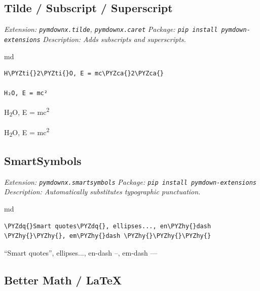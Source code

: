 \documentclass[a4paper,twoside]{article}
\begin{document}
\subsection{Tilde / Subscript / Superscript}\label{tilde-subscript-superscript}

\emph{Extension: \texttt{pymdownx.tilde}, \texttt{pymdownx.caret}}
\emph{Package: \texttt{pip install pymdown-\allowbreak{}extensions}}
\emph{Description: Adds subscripts and superscripts.}

\begin{code}{md}{}{}
\begin{Verbatim}[commandchars=\\\{\},breaklines, breakanywhere, commandchars=\\\{\}]
H\PYZti{}2\PYZti{}O, E = mc\PYZca{}2\PYZca{}

H₂O, E = mc²
\end{Verbatim}
\end{code}
\begin{displayquote}

H\textsubscript{2}O, E = mc\textsuperscript{2}

H\textsubscript{2}O, E = mc\textsuperscript{2}

\end{displayquote}
\subsection{SmartSymbols}\label{smartsymbols}

\emph{Extension: \texttt{pymdownx.smartsymbols}}
\emph{Package: \texttt{pip install pymdown-\allowbreak{}extensions}}
\emph{Description: Automatically substitutes typographic punctuation.}

\begin{code}{md}{}{}
\begin{Verbatim}[commandchars=\\\{\},breaklines, breakanywhere, commandchars=\\\{\}]
\PYZdq{}Smart quotes\PYZdq{}, ellipses..., en\PYZhy{}dash \PYZhy{}\PYZhy{}, em\PYZhy{}dash \PYZhy{}\PYZhy{}\PYZhy{}
\end{Verbatim}
\end{code}
\begin{displayquote}

\enquote{Smart quotes}, ellipses..., en-dash --, em-dash ---

\end{displayquote}
\subsection{Better Math / LaTeX}\label{better-math-latex}
\end{document}
